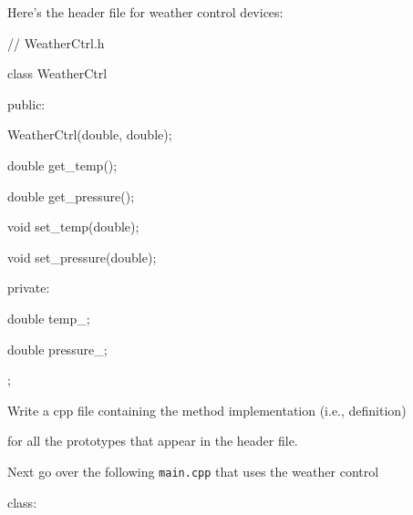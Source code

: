 Here's the header file for weather control devices:



\begin{consolethree}[escapeinside=||]

// WeatherCtrl.h

class WeatherCtrl

{

public:

    WeatherCtrl(double, double);

    double get_temp();

    double get_pressure();

    void set_temp(double);

    void set_pressure(double);

private:

    double temp_;

    double pressure_;

};

\end{consolethree}



Write a cpp file containing the method implementation (i.e., definition)

for all the prototypes that appear in the header file.



Next go over the following \texttt{main.cpp} that uses the weather control

class:



